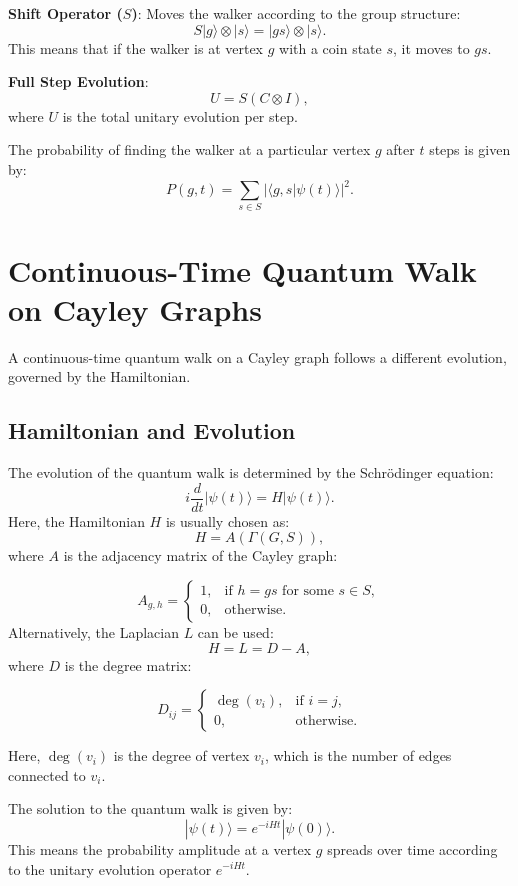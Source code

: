 \documentclass[11pt]{article}
\theoremstyle{definition}
\begin{document}
\textbf{Shift Operator (\( S \))}: Moves the walker according to the group structure:
\[
S |g\rangle \otimes |s\rangle = |gs\rangle \otimes |s\rangle.
\]
This means that if the walker is at vertex \( g \) with a coin state \( s \), it moves to \( gs \).

\textbf{Full Step Evolution}:
\[
U = S (C \otimes I),
\]
where \( U \) is the total unitary evolution per step.

The probability of finding the walker at a particular vertex \( g \) after \( t \) steps is given by:
\[
P(g, t) = \sum_{s \in S} |\langle g, s | \psi(t) \rangle |^2.
\]


\section*{Continuous-Time Quantum Walk on Cayley Graphs}

A continuous-time quantum walk on a Cayley graph follows a different evolution, governed by the Hamiltonian.

\subsection*{Hamiltonian and Evolution}
The evolution of the quantum walk is determined by the Schrödinger equation:
\[
i \frac{d}{dt} |\psi(t)\rangle = H |\psi(t)\rangle.
\]
Here, the Hamiltonian \( H \) is usually chosen as:
\[
H = A(\Gamma(G,S)),
\]
where \( A \) is the adjacency matrix of the Cayley graph:

\[
A_{g,h} =
\begin{cases}
1, & \text{if } h = gs \text{ for some } s \in S, \\
0, & \text{otherwise}.
\end{cases}
\]
 Alternatively, the Laplacian \( L \) can be used:
\[
H = L = D - A,
\]
where \( D \) is the degree matrix:

\[
D_{ij} =
\begin{cases}
\deg(v_i), & \text{if } i = j, \\
0, & \text{otherwise}.
\end{cases}
\]

Here, \( \deg(v_i) \) is the degree of vertex \( v_i \), which is the number of edges connected to \( v_i \).


The solution to the quantum walk is given by:
\[
|\psi(t)\rangle = e^{-i H t} |\psi(0)\rangle.
\]
This means the probability amplitude at a vertex \( g \) spreads over time according to the unitary evolution operator \( e^{-i H t} \).
\end{document}

